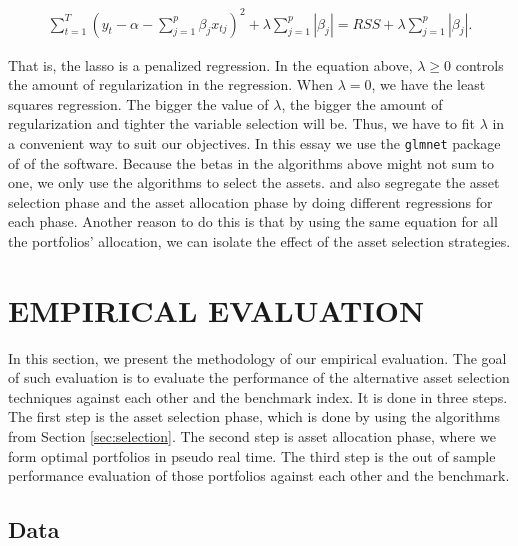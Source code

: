 \documentclass[12pt,oneside,a4paper]{memoir}
\begin{document}
\vspace{-18 pt}
\begin{align} \label{lasso-reg} %
\sum_{t=1}^{T} 
\left( y_t - \alpha - \sum_{j=1}^{p} \beta_j x_{tj} \right)^2 +
\lambda \sum_{j=1}^{p} |\beta_{j}| =
	RSS + 
	\lambda \sum_{j=1}^{p} |\beta_{j}| .
\end{align}

\noindent
That is, the lasso is a penalized regression.
In the equation above, $\lambda \geq 0$ controls the amount of regularization in the regression.
When $\lambda = 0$, we have the least squares regression.
The bigger the value of $\lambda$, the bigger the amount of regularization and tighter the variable selection will be.
Thus, we have to fit $\lambda$ in a convenient way to suit our objectives.
In this essay we use the \texttt{glmnet} package of  of the  software.
Because the betas in the algorithms above might not sum to one, we only use the algorithms to select the assets.
 and  also segregate the asset selection phase and the asset allocation phase by doing different regressions for each phase.
Another reason to do this is that by using the same equation for all the portfolios' allocation, we can isolate the effect of the asset selection strategies.

\section{EMPIRICAL EVALUATION} \label{sec:experiment:it}

In this section, we present the methodology of our empirical evaluation.
The goal of such evaluation is to evaluate the performance of the alternative asset selection techniques against each other and the benchmark index.
It is done in three steps.
The first step is the asset selection phase, which is done by using the algorithms from Section \ref{sec:selection}.
The second step is asset allocation phase, where we form optimal portfolios in pseudo real time.
The third step is the out of sample performance evaluation of those portfolios against each other and the benchmark.

\subsection{Data} \label{sec:data}
\end{document}
